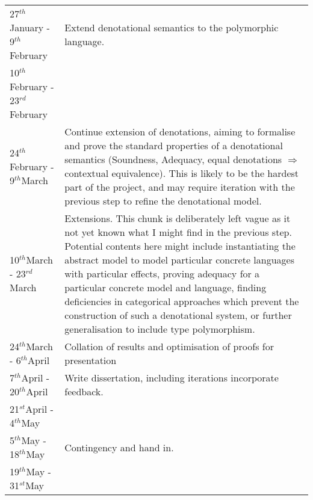 \documentclass[11pt]{article}
\newcommand{\st}{$^{st}$}
\renewcommand{\th}{$^{th}$}
\newcommand{\rd}{$^{rd}$}
\begin{document}
\begin{tabular}{|p{6cm}||p{10cm}|}
	27\th January - 9\th February &  Extend denotational semantics to the polymorphic language.
	\\\cline{1-1}
	10\th February - 23\rd February &  \\\hline
	24\th February - 9\th March & Continue extension of denotations, aiming to formalise and prove the standard properties of a denotational semantics (Soundness, Adequacy, equal denotations $\Rightarrow$ contextual equivalence). This is likely to be the hardest part of the project, and may require iteration with the previous step to refine the denotational model. \\\hline
	10\th March - 23\rd March & Extensions. This chunk is deliberately left vague as it not yet known what I might find in the previous step. Potential contents here might include instantiating the abstract model to model particular concrete languages with particular effects, proving adequacy for a particular concrete model and language, finding deficiencies in categorical approaches which prevent the construction of such a denotational system, or further generalisation to include type polymorphism. \\\hline
	24\th March - 6\th April & Collation of results and optimisation of proofs for presentation \\\hline
	7\th April - 20\th April & Write dissertation, including iterations incorporate feedback. \\\cline{1-1}
	21\st April - 4\th May &\\\hline
	5\th May - 18\th May & Contingency and hand in.\\\cline{1-1}
	19\th May - 31\st May & \\
\hline
\end{tabular}

\newpage
\appendix
\end{document}
